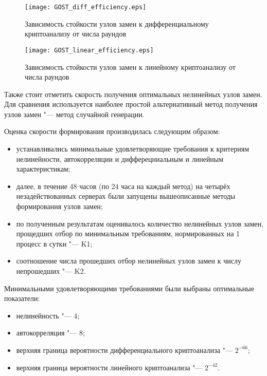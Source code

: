 \begin{figure}
    \centering\texttt{[image: GOST\_diff\_efficiency.eps]}
    \caption{Зависимость стойкости узлов замен к дифференциальному криптоанализу от числа раундов}
    \label{fig:GOST_diff_efficiency}
\end{figure}

\begin{figure}
    \centering\texttt{[image: GOST\_linear\_efficiency.eps]}
    \caption{Зависимость стойкости узлов замен к линейному криптоанализу от числа раундов}
    \label{fig:GOST_linear_efficiency}
\end{figure}

Также стоит отметить скорость получения оптимальных нелинейных узлов замен.
Для сравнения используется наиболее простой альтернативный метод получения узлов
замен "--- метод случайной генерации.

Оценка скорости формирования производилась следующим образом:
\begin{itemize}

    \item устанавливались минимальные удовлетворяющие требования к критериям
    нелинейности, автокорреляции и дифферецниальным и линейным характеристикам;

    \item далее, в течение 48 часов (по 24 часа на каждый метод) на четырёх
    незадействованных серверах были запущены вышеописанные методы формирования
    узлов замен;

    \item по полученным результатам оценивалось количество нелинейных узлов
    замен, прощедших отбор по минимальным требованиям, нормированных на 1
    процесс в сутки "--- K1;

    \item соотношение числа прошедших отбор нелинейных узлов замен к числу
    непрошедших "--- K2.

\end{itemize}

Минимальными удовлетворяющими требованиями были выбраны оптимальные показатели:
\begin{itemize}
    \item нелинейность "--- 4;
    \item автокорреляция "--- 8;
    \item верхняя граница вероятности дифференциального криптоанализа "--- $2^{-66}$;
    \item верхняя граница вероятности линейного криптоанализа "--- $2^{-42}$.
\end{itemize}

